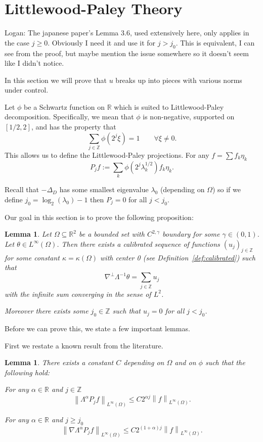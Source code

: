 \documentclass[11pt]{amsart}
\newtheorem{lemma}[theorem]{Lemma}
\theoremstyle{remark}
\theoremstyle{definition}
\newcommand{\R}{\mathbb{R}}
\newcommand{\Z}{\mathbb{Z}}
\newcommand{\norm}[1]{\left\lVert#1\right\rVert}
\newcommand{\grad}{\nabla}
\newcommand{\Laplace}{\Delta}
\newcommand{\eigen}[1]{\eta_{#1}} %
\begin{document}

\section{Littlewood-Paley Theory} \label{sec:littlewood paley}

Logan: The japanese paper's Lemma 3.6, used extensively here, only applies in the case $j \geq 0$. Obviously I need it and use it for $j > j_0$.  This is equivalent, I can see from the proof, but maybe mention the issue somewhere so it doesn't seem like I didn't notice.  

In this section we will prove that $u$ breaks up into pieces with various norms under control.  

Let $\phi$ be a Schwartz function on $\R$ which is suited to Littlewood-Paley decomposition.  Specifically, we mean that $\phi$ is non-negative, supported on $[1/2,2]$, and has the property that
\[ \sum_{j \in \Z} \phi(2^j \xi) = 1 \qquad \forall \xi \neq 0. \]
This allows us to define the Littlewood-Paley projections.  For any $f = \sum f_k \eigen{k}$
\[ P_j f := \sum_k \phi(2^j \lambda_k^{1/2}) f_k \eigen{k}. \]

Recall that $-\Laplace_D$ has some smallest eigenvalue $\lambda_0$ (depending on $\Omega$) so if we define $j_0 = \log_2(\lambda_0)-1$ then $P_j = 0$ for all $j < j_0$.

Our goal in this section is to prove the following proposition:

\begin{lemma} \label{thm:u is calibrated}
Let $\Omega \subseteq \R^2$ be a bounded set with $C^{2,\gamma}$ boundary for some $\gamma \in (0,1)$.  Let $\theta \in L^\infty(\Omega)$.  Then there exists a calibrated sequence of functions $(u_j)_{j \in \Z}$ for some constant $\kappa = \kappa(\Omega)$ with center 0 (see Definition~\ref{def:calibrated}) such that
\[ \grad^\perp \Lambda^{-1} \theta = \sum_{j \in \Z} u_j \]
with the infinite sum converging in the sense of $L^2$.  

Moreover there exists some $j_0 \in \Z$ such that $u_j = 0$ for all $j < j_0$.  
\end{lemma}

Before we can prove this, we state a few important lemmas.  

First we restate a known result from the literature.  
\begin{lemma} \label{thm:IMT stuff}
There exists a constant $C$ depending on $\Omega$ and on $\phi$ such that the following hold:

For any $\alpha \in \R$ and $j \in \Z$
\[ \norm{\Lambda^\alpha P_j f}_{L^\infty(\Omega)} \leq C 2^{\alpha j} \norm{f}_{L^\infty(\Omega)}. \]

For any $\alpha \in \R$ and $j \geq j_0$
\[ \norm{\grad \Lambda^\alpha P_j f}_{L^\infty(\Omega)} \leq C 2^{(1+\alpha) j} \norm{f}_{L^\infty(\Omega)}. \]
\end{lemma}
\end{document}
